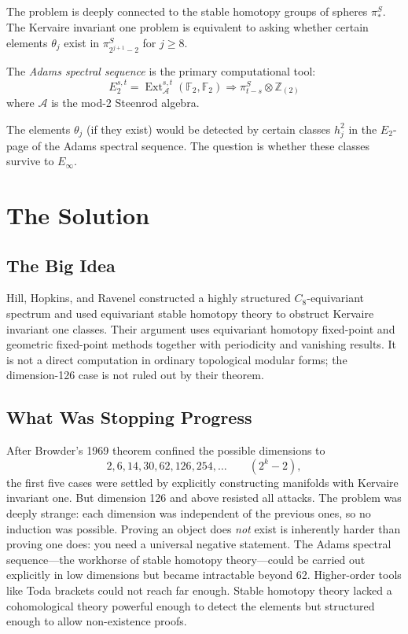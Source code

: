 The problem is deeply connected to the stable homotopy groups of spheres $\pi_*^S$. The Kervaire invariant one problem is equivalent to asking whether certain elements $\theta_j$ exist in $\pi_{2^{j+1}-2}^S$ for $j \geq 8$.

The \emph{Adams spectral sequence} is the primary computational tool:
\begin{equation}
E_2^{s,t} = \operatorname{Ext}_{\mathcal{A}}^{s,t}(\mathbb{F}_2, \mathbb{F}_2) \Rightarrow \pi_{t-s}^S \otimes \mathbb{Z}_{(2)}
\end{equation}
where $\mathcal{A}$ is the mod-2 Steenrod algebra.

The elements $\theta_j$ (if they exist) would be detected by certain classes $h_j^2$ in the $E_2$-page of the Adams spectral sequence. The question is whether these classes survive to $E_\infty$.

\section{The Solution}

\subsection{The Big Idea}

Hill, Hopkins, and Ravenel constructed a highly structured $C_8$-equivariant spectrum and used equivariant stable homotopy theory to obstruct Kervaire invariant one classes. Their argument uses equivariant homotopy fixed-point and geometric fixed-point methods together with periodicity and vanishing results. It is not a direct computation in ordinary topological modular forms; the dimension-126 case is not ruled out by their theorem.

\subsection{What Was Stopping Progress}

After Browder's 1969 theorem confined the possible dimensions to
\[
2,6,14,30,62,126,254,\ldots\qquad (2^k-2),
\]
the first five cases were settled by explicitly constructing manifolds with Kervaire invariant one. But dimension 126 and above resisted all attacks. The problem was deeply strange: each dimension was independent of the previous ones, so no induction was possible. Proving an object does \emph{not} exist is inherently harder than proving one does: you need a universal negative statement. The Adams spectral sequence---the workhorse of stable homotopy theory---could be carried out explicitly in low dimensions but became intractable beyond 62. Higher-order tools like Toda brackets could not reach far enough. Stable homotopy theory lacked a cohomological theory powerful enough to detect the elements but structured enough to allow non-existence proofs.

